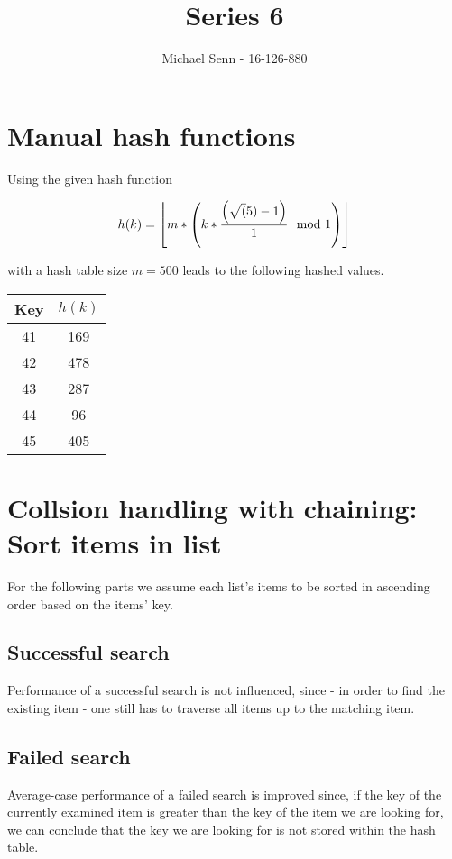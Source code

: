 \documentclass[a4paper]{scrartcl}
\title{Series 6}
\author{Michael Senn - 16-126-880}
\date{}
\DeclarePairedDelimiter\floor{\lfloor}{\rfloor}
\begin{document}
\maketitle

\section{Manual hash functions}

Using the given hash function

\[
	h(k) = \floor*{m * \left( k * \frac{\left( \sqrt(5) - 1 \right)}{1} \mod 1 \right)}
\]

with a hash table size $m = 500$ leads to the following hashed values.
\\

\begin{tabular}{|c|c|}
	\hline
	Key & $h(k)$ \\
	\hline
	41 & 169 \\
	42 & 478 \\
	43 & 287 \\
	44 & 96 \\
	45 & 405 \\
	\hline
\end{tabular}

\section{Collsion handling with chaining: Sort items in list}

For the following parts we assume each list's items to be sorted in ascending
order based on the items' key.

\subsection{Successful search}

Performance of a successful search is not influenced, since - in order to find
the existing item - one still has to traverse all items up to the matching
item.

\subsection{Failed search}

Average-case performance of a failed search is improved since, if the key of
the currently examined item is greater than the key of the item we are looking
for, we can conclude that the key we are looking for is not stored within the
hash table.
\end{document}
